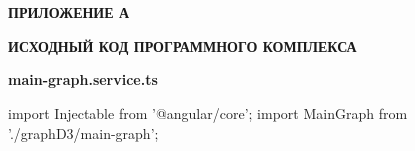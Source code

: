 \chapter*{}
\begin{flushright}
	\textbf{ПРИЛОЖЕНИЕ А}
\end{flushright}
\begin{center}
	\textbf{ИСХОДНЫЙ КОД ПРОГРАММНОГО КОМПЛЕКСА}
\end{center}

\textbf{main-graph.service.ts}

\begin{spverbatim}
import {Injectable} from '@angular/core';
import {MainGraph} from './graphD3/main-graph';

\end{spverbatim}

